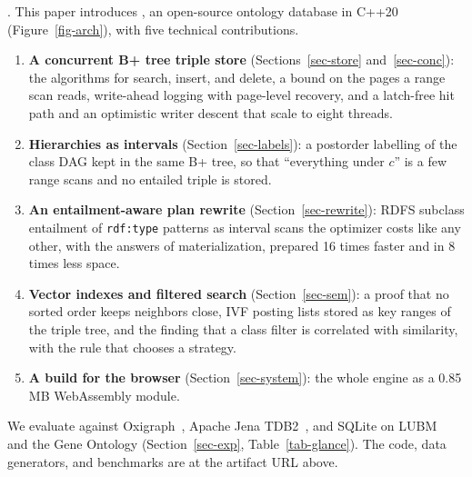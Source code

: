 .
This paper introduces \sys, an open-source ontology database in C++20
(Figure~\ref{fig-arch}), with five technical contributions.
\begin{enumerate}
\item \textbf{A concurrent B+ tree triple store} (Sections~\ref{sec-store}
  and~\ref{sec-conc}): the algorithms for search, insert, and delete, a bound
  on the pages a range scan reads, write-ahead logging with page-level
  recovery, and a latch-free hit path and an optimistic writer descent that
  scale to eight threads.
\item \textbf{Hierarchies as intervals} (Section~\ref{sec-labels}): a postorder
  labelling of the class DAG kept in the same B+ tree, so that ``everything
  under $c$'' is a few range scans and no entailed triple is stored.
\item \textbf{An entailment-aware plan rewrite} (Section~\ref{sec-rewrite}):
  RDFS subclass entailment of \texttt{rdf:type} patterns as interval scans the
  optimizer costs like any other, with the answers of materialization, prepared
  16 times faster and in 8 times less space.
\item \textbf{Vector indexes and filtered search} (Section~\ref{sec-sem}): a
  proof that no sorted order keeps neighbors close, IVF posting lists stored as
  key ranges of the triple tree, and the finding that a class filter is
  correlated with similarity, with the rule that chooses a strategy.
\item \textbf{A build for the browser} (Section~\ref{sec-system}): the whole
  engine as a 0.85\,MB WebAssembly module.
\end{enumerate}
We evaluate \sys against Oxigraph~\cite{oxigraph}, Apache Jena
TDB2~\cite{jenatdb}, and SQLite on LUBM~\cite{lubm} and the Gene Ontology
(Section~\ref{sec-exp}, Table~\ref{tab-glance}).
The code, data generators, and benchmarks are at the artifact URL above.
